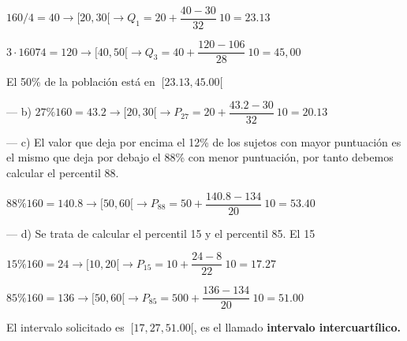\begin{ejemplo}
\begin{ejre}
$160/4=40 \to [20,30[ \to Q_1=20+\dfrac{40-30}{32}\ 10=23.13$

 $3\cdot 16074=120\to [40,50[ \to Q_3=40+\dfrac{120-106}{28}\ 10=45,00$
 
 El 50\% de la población está en $\ [23.13,45.00[$
 
 --- b) $27\%160=43.2 \to [20,30[ \to P_{27}=20+\dfrac{43.2-30}{32}\ 10= 20.13$

--- c) El valor que deja por encima el 12\% de los sujetos con mayor puntuación es el mismo que deja por debajo el 88\% con menor puntuación, por tanto debemos calcular el percentil 88.

$88\%160=140.8 \to [50,60[ \to P_{88}=50+\dfrac{140.8-134}{20} \ 10 =53.40$

--- d) Se trata de calcular el percentil 15 y el percentil 85. El 15%

$15\% 160= 24 \to [10,20[ \to P_{15}=10+\dfrac{24-8}{22}\ 10=17.27$

$85\% 160=136 \to [50,60[ \to P_{85}=500+\dfrac{136-134}{20}\ 10=51.00$

El intervalo solicitado es $\ [17,27,51.00[$, es el llamado \textbf{intervalo intercuartílico.}

\end{ejre}
\end{ejemplo}


